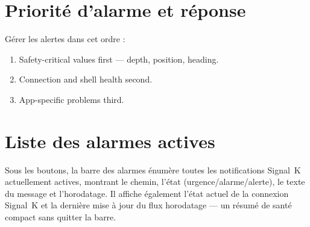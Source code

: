 \section{Priorité d'alarme et réponse}

Gérer les alertes dans cet ordre :

\begin{enumerate}
  \item Safety-critical values first --- depth, position, heading.
  \item Connection and shell health second.
  \item App-specific problems third.
\end{enumerate}

\section{Liste des alarmes actives}

Sous les boutons, la barre des alarmes énumère toutes les notifications Signal~K actuellement actives,
montrant le chemin, l'état (urgence/alarme/alerte), le texte du message et l'horodatage.
Il affiche également l'état actuel de la connexion Signal~K et la dernière mise à jour du flux
horodatage --- un résumé de santé compact sans quitter la barre.
